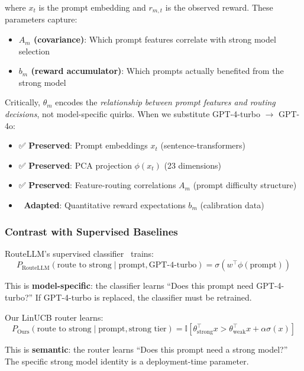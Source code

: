 where $x_t$ is the prompt embedding and $r_{m,t}$ is the observed reward. These parameters capture:
\begin{itemize}
    \item \textbf{$A_m$ (covariance)}: Which prompt features correlate with strong model selection
    \item \textbf{$b_m$ (reward accumulator)}: Which prompts actually benefited from the strong model
\end{itemize}

Critically, $\theta_m$ encodes the \emph{relationship between prompt features and routing decisions}, not model-specific quirks. When we substitute GPT-4-turbo $\to$ GPT-4o:
\begin{itemize}
    \item ✅ \textbf{Preserved}: Prompt embeddings $x_t$ (sentence-transformers)
    \item ✅ \textbf{Preserved}: PCA projection $\phi(x_t)$ (23 dimensions)
    \item ✅ \textbf{Preserved}: Feature-routing correlations $A_m$ (prompt difficulty structure)
    \item 🔄 \textbf{Adapted}: Quantitative reward expectations $b_m$ (calibration data)
\end{itemize}

\subsubsection{Contrast with Supervised Baselines}

RouteLLM's supervised classifier~\cite{ong2024routellm} trains:
\begin{equation}
    P_{\text{RouteLLM}}(\text{route to strong} \mid \text{prompt}, \text{GPT-4-turbo}) = \sigma(w^\top \phi(\text{prompt}))
\end{equation}

This is \textbf{model-specific}: the classifier learns ``Does this prompt need GPT-4-turbo?'' If GPT-4-turbo is replaced, the classifier must be retrained.

Our LinUCB router learns:
\begin{equation}
    P_{\text{Ours}}(\text{route to strong} \mid \text{prompt}, \text{strong tier}) = \mathbb{I}\left[\theta_{\text{strong}}^\top x > \theta_{\text{weak}}^\top x + \alpha \sigma(x)\right]
\end{equation}

This is \textbf{semantic}: the router learns ``Does this prompt need a strong model?'' The specific strong model identity is a deployment-time parameter.

